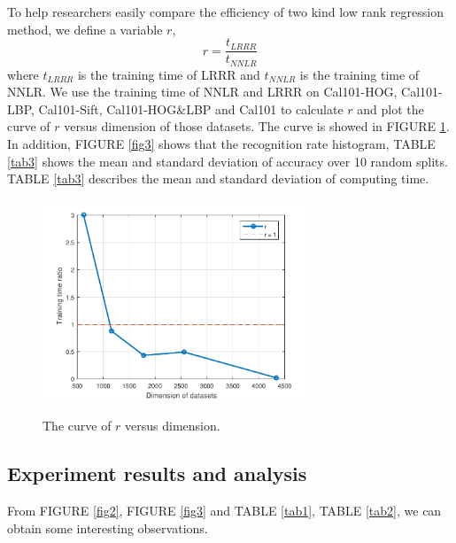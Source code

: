 \documentclass{ieeeaccess}
\begin{document}
To help researchers easily compare the efficiency of two kind low rank regression method, we define a variable $r$,
\begin{equation}\label{eq21}
r = \frac{{{t_{LRRR}}}}{{{t_{NNLR}}}}
\end{equation}
\noindent where ${{t_{LRRR}}}$ is the training time of LRRR and ${{t_{NNLR}}}$ is the training time of NNLR. We use the training time of NNLR and LRRR on Cal101-HOG, Cal101-LBP, Cal101-Sift, Cal101-HOG\&LBP and Cal101 to calculate $r$ and plot the curve of $r$ versus dimension of those datasets. The curve is showed in FIGURE \ref{fig4}. In addition, FIGURE \ref{fig3} shows that the recognition rate histogram, TABLE \ref{tab3} shows the mean and standard deviation of accuracy over 10 random splits. TABLE \ref{tab3} describes the mean and standard deviation of computing time.



\begin{figure}[t]
  \centering
  \includegraphics[width=8cm]{dimension_time}\\
  \caption{The curve of $r$ versus dimension.}\label{fig4}
\end{figure}

\subsection{Experiment results and analysis}
From FIGURE \ref{fig2}, FIGURE \ref{fig3} and TABLE \ref{tab1}, TABLE \ref{tab2}, we can obtain some interesting observations.
\end{document}
